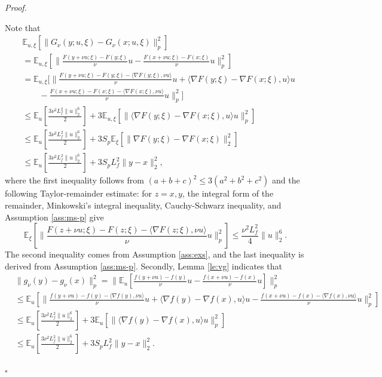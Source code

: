 \documentclass[11pt]{article}
\newenvironment{proof}[1][Proof]{%
    \par\noindent\textit{#1.}\enspace
  }{%
    \hfill\ensuremath{\square}\par
  }%
\numberwithin{equation}{section}
\newcommand{\E}{\mathbb{E}}
\begin{document}
\begin{proof}
Note that
    \begin{equation*}     \begin{aligned}
    &\E_{u,\xi} [\|G_\nu(y;u,\xi)-G_\nu(x;u,\xi)\|_p^2]\\
    & =\E_{u,\xi} [\|\frac{F(y+\nu u;\xi)-F(y;\xi)}{\nu} u-\frac{F(x+\nu u;\xi)-F(x;\xi)}{\nu} u\|_p^2]\\
    & =\E_{u,\xi} [\|\frac{F(y+\nu u;\xi)-F(y;\xi)-\langle\nabla F(y;\xi),\nu u\rangle}{\nu} u+\langle \nabla F(y;\xi) - \nabla F(x;\xi), u\rangle u\\
    &\qquad-\frac{F(x+\nu u;\xi)-F(x;\xi)-\langle\nabla F(x;\xi),\nu u\rangle}{\nu} u\|_p^2]\\
    & \leq  \E_u [\frac{3\nu^2L_f^2\|u\|_2^6}{2}] + 3\E_{u,\xi} [\|\langle \nabla F(y;\xi) - \nabla F(x;\xi), u\rangle u\|_p^2]\\
    & \leq  \E_u [\frac{3\nu^2L_f^2\|u\|_2^6}{2}] + 3 S_p \E_\xi [\|\nabla F(y;\xi) - \nabla F(x;\xi)\|_2^2] \\
    &\leq  \E_u [\frac{3\nu^2L_f^2\|u\|_2^6}{2}] + 3 S_p L_f^2 \|y-x\|_2^2,
    \end{aligned}     \end{equation*}
    where the first inequality follows from $(a+b+c)^2\le 3(a^2+b^2+c^2)$ and the following Taylor-remainder estimate: for $z=x,y$, the integral form of the remainder, Minkowski's integral inequality, Cauchy-Schwarz inequality, and Assumption \ref{ass:ms-p} give
    \[
    \E_\xi[\|\frac{F(z+\nu u;\xi)-F(z;\xi)-\langle\nabla F(z;\xi),\nu u\rangle}{\nu}u\|_p^2]
    \leq \frac{\nu^2L_f^2}{4}\|u\|_2^6.
    \]
    The second inequality comes from Assumption \ref{ass:exs}, and the last inequality is derived from Assumption \ref{ass:ms-p}. Secondly, Lemma \ref{le:vg} indicates that
    \begin{align*}
    &\| g_\nu (y) - g_\nu (x) \|_p^2 
    =  \|\E_u [\frac{f(y+\nu u)-f(y)}{\nu} u - \frac{f(x+\nu u)-f(x)}{\nu} u]\|_p^2\\
    & \leq \E_u [\|\frac{f(y+\nu u)-f(y)-\langle \nabla f(y) , \nu u \rangle}{\nu} u + \langle  \nabla f(y) -  \nabla f(x),u\rangle u - \frac{f(x+\nu u)-f(x)-\langle \nabla f(x) , \nu u \rangle}{\nu} u\|_p^2 ]\\
    & \leq   \E_u [\frac{3\nu^2L_f^2\|u\|_2^6}{2}] + 3\E_u [\|\langle \nabla f(y)- \nabla f(x), u\rangle u\|_p^2] \\
    & \leq \E_u [\frac{3\nu^2L_f^2\|u\|_2^6}{2}] + 3S_p L_f^2 \|y-x\|_2^2.
    \end{align*} 

\end{proof}
\end{document}

